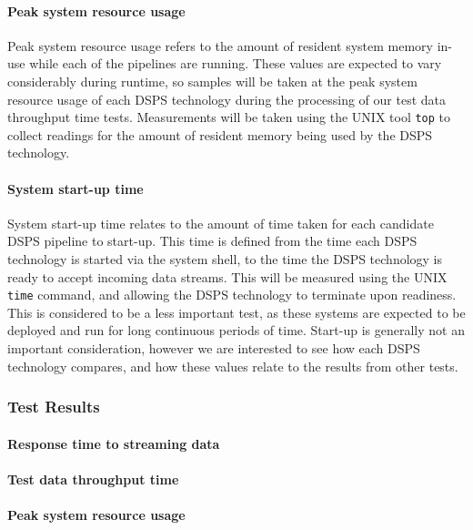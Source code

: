 \paragraph{Peak system resource usage}

Peak system resource usage refers to the amount of resident system memory in-use while each of the pipelines are running.
These values are expected to vary considerably during runtime, so samples will be taken at the peak system resource usage of each DSPS
technology during the processing of our test data throughput time tests.
Measurements will be taken using the UNIX tool \texttt{top} to collect readings for the amount of resident memory being used
by the DSPS technology.

\paragraph{System start-up time}

System start-up time relates to the amount of time taken for each candidate DSPS pipeline to start-up. This time is
defined from the time each DSPS technology is started via the system shell, to the time the DSPS technology is
ready to accept incoming data streams. This will be measured using the UNIX \texttt{time} command, and allowing the
DSPS technology to terminate upon readiness. This is considered to be a less important test, as these systems are expected
to be deployed and run for long continuous periods of time. Start-up is generally not an important consideration, however
we are interested to see how each DSPS technology compares, and how these values relate to the results from other tests.



\subsubsection{Test Results} %
\label{sub:test_results}

\paragraph{Response time to streaming data}


\paragraph{Test data throughput time}


\paragraph{Peak system resource usage}


